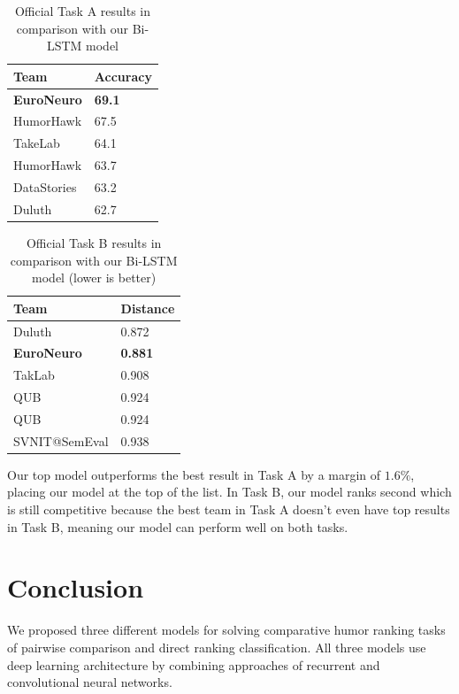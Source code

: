 \documentclass[10pt, a4paper]{article}
\begin{document}
\begin{table}
  \caption{Official Task A results in comparison with our Bi-LSTM model}
 \label{tab:task_a_official}
 \begin{center}
 \begin{tabular}{ll}
 \toprule
     Team & Accuracy\\
 \midrule
     \textbf{EuroNeuro} & \textbf{69.1} \\
     HumorHawk & 67.5 \\
     TakeLab & 64.1\\
     HumorHawk & 63.7\\
     DataStories & 63.2\\
     Duluth & 62.7\\
 \bottomrule
 \end{tabular}
 \end{center}
\end{table}

\begin{table}
    \caption{Official Task B results in comparison with our Bi-LSTM model (lower is
    better)}
 \label{tab:task_b_official}
 \begin{center}
 \begin{tabular}{ll}
 \toprule
     Team & Distance\\
 \midrule
     Duluth & 0.872 \\
     \textbf{EuroNeuro} & \textbf{0.881} \\
     TakLab & 0.908\\
     QUB & 0.924\\
     QUB & 0.924\\
     SVNIT@SemEval & 0.938\\
 \bottomrule
 \end{tabular}
 \end{center}
\end{table}

Our top model outperforms the best result in Task A by a margin of
$1.6\%$, placing our model at the top of the list. In Task B, our model ranks
second which is still competitive because the best team in Task A doesn't even
have top results in Task B, meaning our model can perform well on both tasks.


\section{Conclusion}
We proposed three different models for solving comparative humor ranking tasks
of pairwise comparison and direct ranking classification. All three
models use deep learning architecture by combining approaches of recurrent and
convolutional neural networks.
\end{document}
